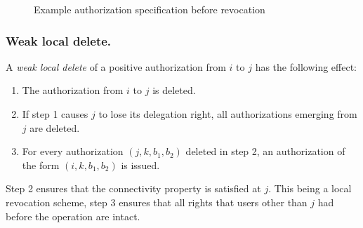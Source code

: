 \documentclass[runningheads]{llncs}
\begin{document}
\vspace{-3mm}
\begin{figure}[H]
\center
{}
\caption{Example authorization specification before revocation}
\end{figure}
\vspace{-7mm}

\subsubsection{Weak local delete.}
A \emph{weak local delete} of a positive authorization from $i$ to $j$ has the following effect:
\vspace{-1mm}
\begin{enumerate}
 \item The authorization from $i$ to $j$ is deleted.
 \item If step 1 causes $j$ to lose its delegation right, all authorizations emerging from $j$ are deleted.
 \item For every authorization $(j,k,b_1,b_2)$ deleted in step 2, an authorization of the form $(i,k,b_1,b_2)$ is issued.
\end{enumerate}
\vspace{-1mm}
Step 2 ensures that the connectivity property is satisfied at $j$. This being a local revocation scheme, step 3 ensures that all rights that users other than $j$ had before the operation are intact.
\end{document}
